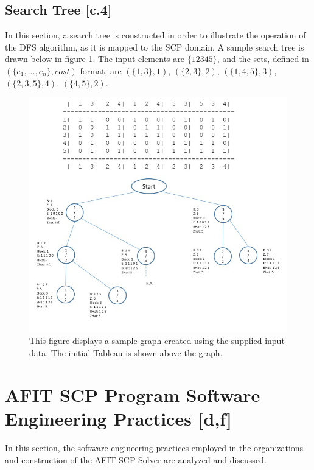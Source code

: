 \documentclass[12pt]{article}
\begin{document}
	
	\subsection{Search Tree [c.4]}
	
	In this section, a search tree is constructed in order to illustrate the operation of the DFS algorithm, as it is mapped to the SCP domain. A sample search tree is drawn below in figure \ref{fig:samplegraph}. The input elements are $\{1 2 3 4 5\}$, and the sets, defined in $(\{e_1,...,e_n\}, cost)$ format, are $(\{1, 3\},1)$,
	$(\{2, 3\},2)$,
	$(\{1, 4, 5\},3)$,
	$(\{2, 3, 5\},4)$,
	$(\{4, 5\}, 2)$.
	
	\begin{figure}[ht!] \label{fig:samplegraph}
		
		
		\centering
		\includegraphics[width = 5.5in]{graph1.png}
		
		
		\caption{This figure displays a sample graph created using the supplied input data. The initial Tableau is shown above the graph.}
		
		
	\end{figure}
	
	\section{AFIT SCP Program Software Engineering Practices [d,f]} \label{scn:design}
	In this section, the software engineering practices employed in the organizations and construction of the AFIT SCP Solver are analyzed and discussed.
	
\end{document}
